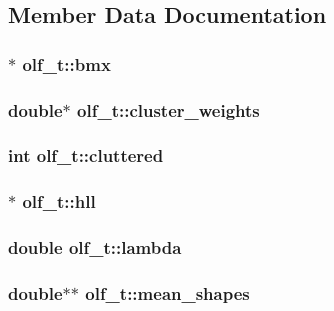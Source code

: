 \subsection{Member Data Documentation}
\hypertarget{structolf__t_a8f243ce482e7ee6734f5ef78a9e90b40}{
\subsubsection[{bmx}]{$\ast$ {\bf olf\_\-t::bmx}}}
\label{structolf__t_a8f243ce482e7ee6734f5ef78a9e90b40}
\hypertarget{structolf__t_aa6f327d893d0e668ced4cc01a9a3b6b6}{
\subsubsection[{cluster\_\-weights}]{\setlength{\rightskip}{0pt plus 5cm}double$\ast$ {\bf olf\_\-t::cluster\_\-weights}}}
\label{structolf__t_aa6f327d893d0e668ced4cc01a9a3b6b6}
\hypertarget{structolf__t_a1d5c1ab4c411ce11b47cd868523aa156}{
\subsubsection[{cluttered}]{\setlength{\rightskip}{0pt plus 5cm}int {\bf olf\_\-t::cluttered}}}
\label{structolf__t_a1d5c1ab4c411ce11b47cd868523aa156}
\hypertarget{structolf__t_a7a344136743e02ce08dfa841bf3a8afe}{
\subsubsection[{hll}]{$\ast$ {\bf olf\_\-t::hll}}}
\label{structolf__t_a7a344136743e02ce08dfa841bf3a8afe}
\hypertarget{structolf__t_ac6e226fa1e02d59c46fb9421d2c9139b}{
\subsubsection[{lambda}]{\setlength{\rightskip}{0pt plus 5cm}double {\bf olf\_\-t::lambda}}}
\label{structolf__t_ac6e226fa1e02d59c46fb9421d2c9139b}
\hypertarget{structolf__t_a00c5ee0e3af90b16fc060f72e7411296}{
\subsubsection[{mean\_\-shapes}]{\setlength{\rightskip}{0pt plus 5cm}double$\ast$$\ast$ {\bf olf\_\-t::mean\_\-shapes}}}
